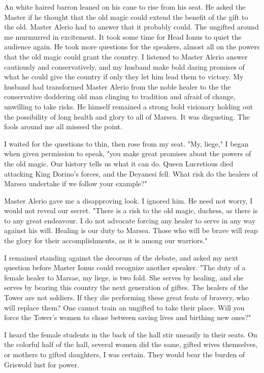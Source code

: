 \documentclass{article}
\begin{document}
An white haired barron leaned on his cane to rise from his seat. He asked the Master if he thought that the old magic could extend the benefit of the gift to the old. Master Alerio had to answer that it probably could. The ungifted around me murmurred in excitement. It took some time for Head Ionus to quiet the audience again. He took more questions for the speakers, almost all on the powers that the old magic could grant the country. I listened to Master Alerio answer cautiously and conservatively, and my husband make bold daring promises of what he could give the country if only they let him lead them to victory. My husband had transformed Master Alerio from the noble healer to the the conservative doddering old man clinging to tradition and afraid of change, unwilling to take risks. He himself remained a strong bold visionary holding out the possibility of long health and glory to all of Marsea. It was disgusting. The fools around me all misssed the point.

I waited for the questions to thin, then rose from my seat. "My, liege," I began when given permission to speak, "you make great promises about the powers of the old magic. Our history tells us what it can do. Queen Lucretious died attacking King Dorino's forces, and the Deyanesi fell. What risk do the healers of Marsea undertake if we follow your example?"

Master Alerio gave me a disapproving look. I ignored him. He need not worry, I would not reveal our secret. "There is a risk to the old magic, duchess, as there is to any great endeavour. I do not advocate forcing any healer to serve in any way against his will. Healing is our duty to Marsea. Those who will be brave will reap the glory for their accomplishments, as it is among our warriors." 

I remained standing against the decorum of the debate, and asked my next question before Master Ionus could recognize another speaker. "The duty of a female healer to Marsae, my liege, is two fold. She serves by healing, and she serves by bearing this country the next generation of giftes. The healers of the Tower are not soldiers. If they die performing these great feats of bravery, who will replace them? One cannot train an ungifted to take their place. Will you force the Tower's women to chose between saving lives and birthing new ones?"

I heard the female students in the back of the hall stir uneasily in their seats. On the colorful half of the hall, several women did the same, gifted wives themselves, or mothers to gifted daughters, I was certain. They would bear the burden of Griswold lust for power.
\end{document}
